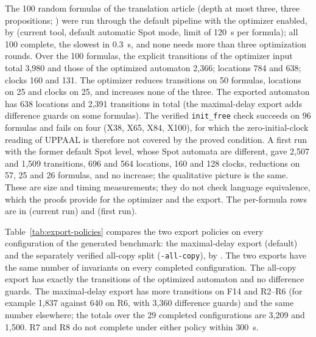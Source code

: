 The 100 random formulas of the translation article (depth at most three, three propositions; ) were run through the default pipeline with the optimizer enabled, by  (current tool, default automatic Spot mode, limit of 120~s per formula); all 100 complete, the slowest in 0.3~s, and none needs more than three optimization rounds. Over the 100 formulas, the explicit transitions of the optimizer input total 3,980 and those of the optimized automaton 2,366; locations 784 and 638; clocks 160 and 131. The optimizer reduces transitions on 50 formulas, locations on 25 and clocks on 25, and increases none of the three. The exported automaton has 638 locations and 2,391 transitions in total (the maximal-delay export adds difference guards on some formulas). The verified \texttt{init\_free} check succeeds on 96 formulas and fails on four (X38, X65, X84, X100), for which the zero-initial-clock reading of UPPAAL is therefore not covered by the proved condition. A first run with the former default Spot level, whose Spot automata are different, gave 2,507 and 1,509 transitions, 696 and 564 locations, 160 and 128 clocks, reductions on 57, 25 and 26 formulas, and no increase; the qualitative picture is the same. These are size and timing measurements; they do not check language equivalence, which the proofs provide for the optimizer and the export. The per-formula rows are in  (current run) and  (first run).

Table~\ref{tab:export-policies} compares the two export policies on every configuration of the generated benchmark: the maximal-delay export (default) and the separately verified all-copy split (\texttt{-all-copy}), by . The two exports have the same number of invariants on every completed configuration. The all-copy export has exactly the transitions of the optimized automaton and no difference guards. The maximal-delay export has more transitions on F14 and R2--R6 (for example 1,837 against 640 on R6, with 3,360 difference guards) and the same number elsewhere; the totals over the 29 completed configurations are 3,209 and 1,500. R7 and R8 do not complete under either policy within 300~s.


